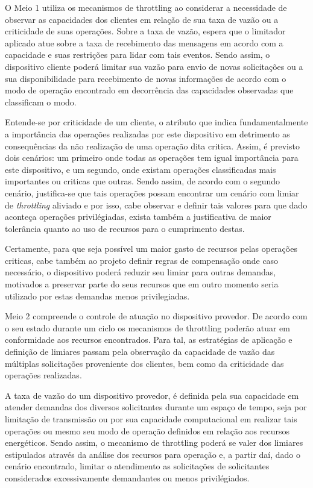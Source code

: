O Meio 1 utiliza os mecanismos de throttling ao considerar a necessidade de observar as capacidades dos clientes em relação de sua taxa de vazão ou a criticidade de suas operações. Sobre a taxa de vazão, espera que o limitador aplicado atue sobre a taxa de recebimento das mensagens em acordo com a capacidade e suas restrições para lidar com tais eventos. Sendo assim, o dispositivo cliente poderá limitar sua vazão para envio de novas solicitações ou a sua disponibilidade para recebimento de novas informações de acordo com o modo de operação encontrado em decorrência das capacidades observadas que classificam o modo.

Entende-se por criticidade de um cliente, o atributo que indica fundamentalmente a importância das operações realizadas por este dispositivo em detrimento as consequências da não realização de uma operação dita critica. Assim, é previsto dois cenários: um primeiro onde todas as operações tem igual importância para este dispositivo, e um segundo, onde existam operações classificadas mais importantes ou criticas que outras. Sendo assim, de acordo com o segundo cenário, justifica-se que tais operações possam encontrar um cenário com limiar de \textit{throttling} aliviado e por isso, cabe observar e definir tais valores para que dado aconteça operações privilégiadas, exista também a justificativa de maior tolerância quanto ao uso de recursos para o cumprimento destas. 

Certamente, para que seja possível um maior gasto de recursos pelas operações criticas, cabe também ao projeto definir regras de compensação onde caso necessário, o dispositivo poderá reduzir seu limiar para outras demandas, motivados a preservar parte do seus recursos que em outro momento seria utilizado por estas demandas menos privilegiadas.

Meio 2 compreende o controle de atuação no dispositivo provedor. De acordo com o seu estado durante um ciclo os mecanismos de throttling poderão atuar em conformidade aos recursos encontrados. Para tal, as estratégias de aplicação e definição de limiares passam pela observação da capacidade de vazão das múltiplas solicitações proveniente dos clientes, bem como da criticidade das operações realizadas. 

A taxa de vazão do um dispositivo provedor, é definida pela sua capacidade em atender demandas dos diversos solicitantes durante um espaço de tempo, seja por limitação de transmissão ou por sua capacidade computacional em realizar tais operações ou mesmo seu modo de operação definidos em relação aos recursos energéticos. Sendo assim, o mecanismo de throttling poderá se valer dos limiares estipulados através da análise dos recursos para operação e, a partir daí, dado o cenário encontrado, limitar o atendimento as solicitações de solicitantes considerados excessivamente demandantes ou menos privilégiados.  

